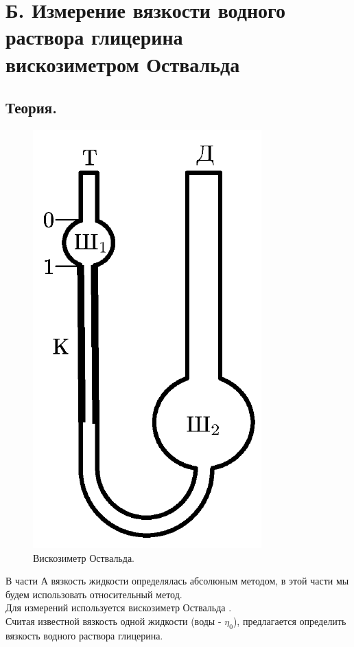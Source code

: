 \documentclass[a4paper,12pt]{article}
\numberwithin{equation}{section}
\begin{document}
\section{Б. Измерение вязкости водного раствора глицерина\\ вискозиметром Оствальда}
\subsection{Теория.}

\begin{figure}[H]
  \centering
  \includegraphics[scale=0.7]{data/b.png}
  \caption{Вискозиметр Оствальда.}
  \label{fig:Ostwald_viscometer}
\end{figure}

В части А вязкость жидкости определялась абсолюным методом, в этой части мы будем использовать относительный метод. \\
Для измерений используется вискозиметр Оствальда . \\
Считая известной вязкость одной жидкости (воды - $\eta_0$), предлагается определить вязкость водного раствора глицерина. \\
\end{document}
